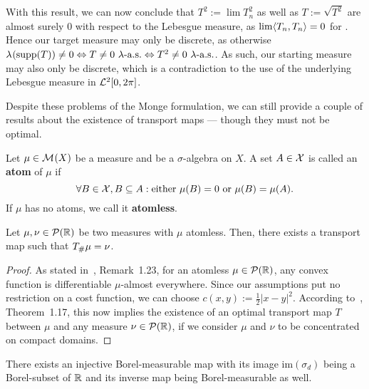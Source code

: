 With this result, we can now conclude that $T^2 := \lim T_n^2$ as well as $T := \sqrt{T^2}$ are almost surely $0$ with respect to the Lebesgue measure, as $\lim \langle T_n, T_n \rangle = 0$ for \Ninf. Hence our target measure may only be discrete, as otherwise $\lambda^{}(\text{supp}(T)) \neq 0 \Leftrightarrow T \neq 0~\lambda\text{-a.s.} \Leftrightarrow T^2 \neq 0~\lambda\text{-a.s.}$. As such, our starting measure may also only be discrete, which is a contradiction to the use of the underlying Lebesgue measure in $\mathcal{L}^{2}[0, 2\pi]$.

Despite these problems of the Monge formulation, we can still provide a couple of results about the existence of transport maps --- though they must not be optimal.

\begin{definition}\label{Atoms}
	Let $\mu \in \mathcal{M}_{}(X)$ be a measure and \X{} be a $\sigma$-algebra on $X$. A set $A \in \mathcal{X}$ is called an \textbf{atom} of $\mu$ if
	\[ \forall B \in \mathcal{X}, B \subseteq A : \text{either } \mu(B) = 0 \text{ or } \mu(B) = \mu(A). \]
	If $\mu$ has no atoms, we call it \textbf{atomless}.
\end{definition}

\begin{lemma}\label{1DTransMapExist}
	Let $\mu, \nu \in \mathcal{P}(\mathbb{R})$ be two measures with $\mu$ atomless. Then, there exists a transport map \map[T]{\R}{\R} such that ${T}_{\#} \mu = \nu$.
\end{lemma}

\begin{proof}
	As stated in~\cite{San2015}, Remark~1.23, for an atomless $\mu \in \mathcal{P}(\mathbb{R})$, any convex function is differentiable $\mu$-almost everywhere. Since our assumptions put no restriction on a cost function, we can choose $c(x, y) := \frac{1}{2} \vert x - y \vert^2$. According to~\cite{San2015}, Theorem~1.17, this now implies the existence of an optimal transport map $T$ between $\mu$ and any measure $\nu \in \mathcal{P}(\mathbb{R})$, if we consider $\mu$ and $\nu$ to be concentrated on compact domains.


\end{proof}

\begin{lemma}\label{BorelExist}
	There exists an injective Borel-measurable map  with its image $\text{im}(\sigma_d)$ being a Borel-subset of $\mathbb{R}$ and its inverse map being Borel-measurable as well.
\end{lemma}

